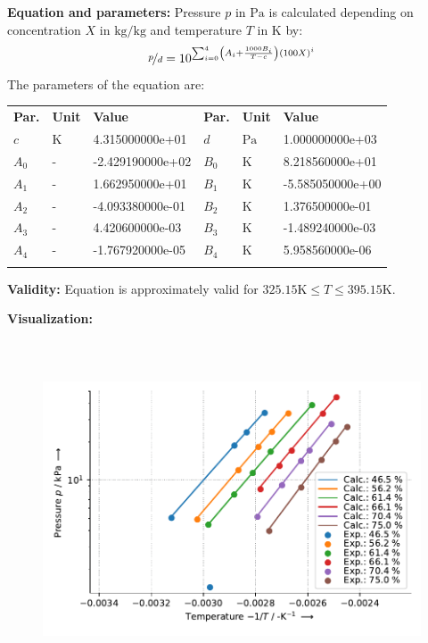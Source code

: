 \textbf{Equation and parameters:}
\newline
%
Pressure $p$ in $\si{\pascal}$ is calculated depending on concentration $X$ in $\si{\kilogram\per\kilogram}$ and  temperature $T$ in $\si{\kelvin}$ by:
%
\begin{equation*}
\nicefrac{p}{d} = 10 ^ { \sum_{i=0}^{4} \left( A_i + \frac{1000 B_i}{T - c} \right) \left( 100 X \right) ^{i}}
\end{equation*}
%
The parameters of the equation are:
%
\begin{longtable}[l]{lll|lll}
\toprule
\addlinespace
\textbf{Par.} & \textbf{Unit} & \textbf{Value} &	\textbf{Par.} & \textbf{Unit} & \textbf{Value} \\
\addlinespace
\midrule
\endhead

\bottomrule
\endfoot
\bottomrule
\endlastfoot
\addlinespace

$c$ & $\si{\kelvin}$ & 4.315000000e+01 & $d$ & $\si{\pascal}$ & 1.000000000e+03 \\
$A_0$ & - & -2.429190000e+02 & $B_0$ & $\si{\kelvin}$ & 8.218560000e+01 \\
$A_1$ & - & 1.662950000e+01 & $B_1$ & $\si{\kelvin}$ & -5.585050000e+00 \\
$A_2$ & - & -4.093380000e-01 & $B_2$ & $\si{\kelvin}$ & 1.376500000e-01 \\
$A_3$ & - & 4.420600000e-03 & $B_3$ & $\si{\kelvin}$ & -1.489240000e-03 \\
$A_4$ & - & -1.767920000e-05 & $B_4$ & $\si{\kelvin}$ & 5.958560000e-06 \\

\addlinespace\end{longtable}

\textbf{Validity:}
\newline
Equation is approximately valid for $325.15 \si{\kelvin} \leq T \leq 395.15 \si{\kelvin}$.
\newline

\textbf{Visualization:}
%
\begin{figure}[!htp]
{\noindent\includegraphics[height=10cm, keepaspectratio]{figs/abs/abs_Water_LiBr_HO(CH2)3OH__ratio_3_5_1_Antoine_1.pdf}}
\end{figure}
%


